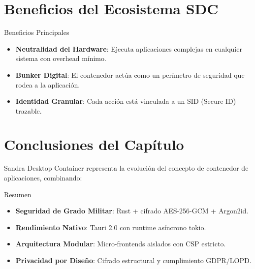 \section{Beneficios del Ecosistema SDC}

\begin{caja}{Beneficios Principales}
\begin{itemize}
\item \textbf{Neutralidad del Hardware}: Ejecuta aplicaciones complejas en cualquier sistema con overhead mínimo.
\item \textbf{Bunker Digital}: El contenedor actúa como un perímetro de seguridad que rodea a la aplicación.
\item \textbf{Identidad Granular}: Cada acción está vinculada a un SID (Secure ID) trazable.
\end{itemize}
\end{caja}


\section{Conclusiones del Capítulo}

Sandra Desktop Container representa la evolución del concepto de contenedor de aplicaciones, combinando:

\begin{caja}{Resumen}
\begin{itemize}
\item \textbf{Seguridad de Grado Militar}: Rust + cifrado AES-256-GCM + Argon2id.
\item \textbf{Rendimiento Nativo}: Tauri 2.0 con runtime asíncrono tokio.
\item \textbf{Arquitectura Modular}: Micro-frontends aislados con CSP estricto.
\item \textbf{Privacidad por Diseño}: Cifrado estructural y cumplimiento GDPR/LOPD.
\end{itemize}
\end{caja}

